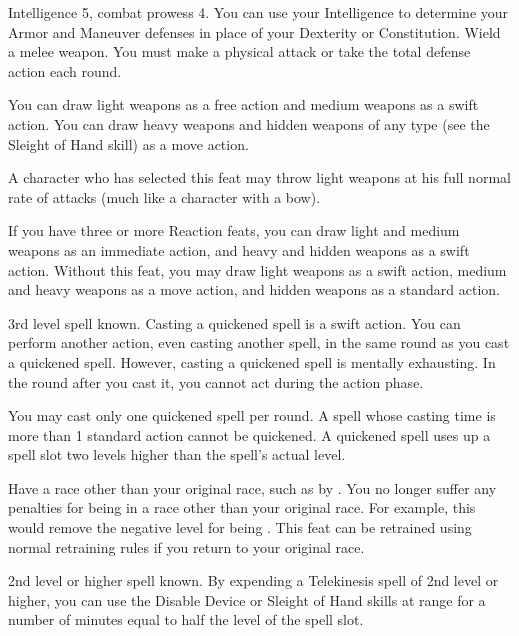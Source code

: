 \featpres Intelligence 5, combat prowess 4.
\featben You can use your Intelligence to determine your Armor and Maneuver defenses in place of your Dexterity or Constitution.
\stylereq Wield a melee weapon.
You must make a physical attack or take the total defense action each round.

\featben You can draw light weapons as a free action and medium weapons as a swift action.
You can draw heavy weapons and hidden weapons of any type (see the Sleight of Hand skill) as a move action.
\par A character who has selected this feat may throw light weapons at his full normal rate of attacks (much like a character with a bow).

If you have three or more Reaction feats, you can draw light and medium weapons as an immediate action, and heavy and hidden weapons as a swift action.
Without this feat, you may draw light weapons as a swift action, medium and heavy weapons as a move action, and hidden weapons as a standard action.

\label{Quicken Spell}
\featpre 3rd level spell known.
\featben Casting a quickened spell is a swift action.
You can perform another action, even casting another spell, in the same round as you cast a quickened spell.
However, casting a quickened spell is mentally exhausting.
In the round after you cast it, you cannot act during the action phase.

You may cast only one quickened spell per round.
A spell whose casting time is more than 1 standard action cannot be quickened.
A quickened spell uses up a spell slot two levels higher than the spell's actual level.

\label{Racial Acclimation}
\featpre Have a race other than your original race, such as by .
\featben You no longer suffer any penalties for being in a race other than your original race.
For example, this would remove the negative level for being .
This feat can be retrained using normal retraining rules if you return to your original race.

\featpre 2nd level or higher  spell known.
\featben By expending a Telekinesis spell of 2nd level or higher, you can use the Disable Device or Sleight of Hand skills at \rngclose range for a number of minutes equal to half the level of the spell slot.


